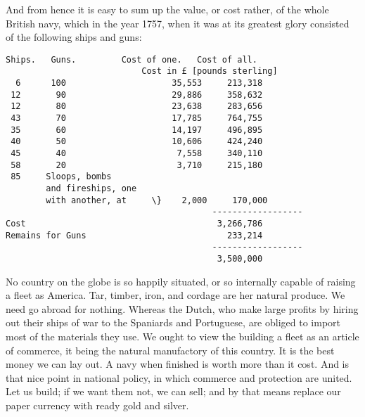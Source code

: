 \documentclass[12pt,oneside]{memoir}
\begin{document}
And from hence it is easy to sum up the value, or cost rather, of the whole British navy, which in the year 1757, when it was at its greatest glory consisted of the following ships and guns:

\begin{verbatim}
Ships.   Guns. 		   Cost of one.   Cost of all.
                           Cost in £ [pounds sterling]
  6      100                     35,553     213,318
 12       90                     29,886     358,632
 12       80                     23,638     283,656
 43       70                     17,785     764,755
 35       60                     14,197     496,895
 40       50                     10,606     424,240
 45       40                      7,558     340,110
 58       20                      3,710     215,180
 85     Sloops, bombs
        and fireships, one
        with another, at     \}    2,000     170,000
                                         ------------------
Cost                                      3,266,786
Remains for Guns                            233,214
                                         ------------------
                                          3,500,000
\end{verbatim}

No country on the globe is so happily situated, or so internally capable of raising a fleet as America. Tar, timber, iron, and cordage are her natural produce. We need go abroad for nothing. Whereas the Dutch, who make large profits by hiring out their ships of war to the Spaniards and Portuguese, are obliged to import most of the materials they use. We ought to view the building a fleet as an article of commerce, it being the natural manufactory of this country. It is the best money we can lay out. A navy when finished is worth more than it cost. And is that nice point in national policy, in which commerce and protection are united. Let us build; if we want them not, we can sell; and by that means replace our paper currency with ready gold and silver.
\end{document}
